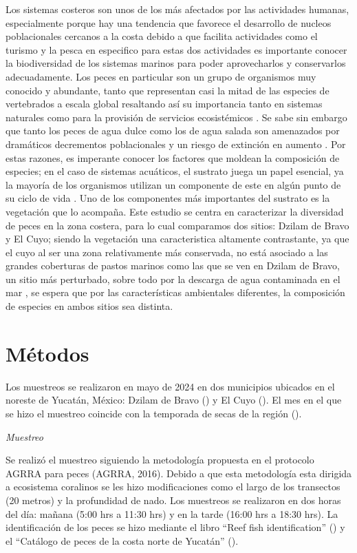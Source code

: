 \documentclass[
  authoryear,
  preprint,
  3p]{elsarticle}
\begin{document}
Los sistemas costeros son unos de los más afectados por las actividades
humanas, especialmente porque hay una tendencia que favorece el
desarrollo de nucleos poblacionales cercanos a la costa debido a que
facilita actividades como el turismo y la pesca \citep{barragán2015} en
especifico para estas dos actividades es importante conocer la
biodiversidad de los sistemas marinos para poder aprovecharlos y
conservarlos adecuadamente. Los peces en particular son un grupo de
organismos muy conocido y abundante, tanto que representan casi la mitad
de las especies de vertebrados a escala global \citep{bingpeng2018}
resaltando así su importancia tanto en sistemas naturales como para la
provisión de servicios ecosistémicos \citep{rönnbäck2007} . Se sabe sin
embargo que tanto los peces de agua dulce como los de agua salada son
amenazados por dramáticos decrementos poblacionales y un riesgo de
extinción en aumento \citep{arthington2016}. Por estas razones, es
imperante conocer los factores que moldean la composición de especies;
en el caso de sistemas acuáticos, el sustrato juega un papel esencial,
ya la mayoría de los organismos utilizan un componente de este en algún
punto de su ciclo de vida \citep{rönnbäck2007}. Uno de los componentes
más importantes del sustrato es la vegetación que lo acompaña. Este
estudio se centra en caracterizar la diversidad de peces en la zona
costera, para lo cual comparamos dos sitios: Dzilam de Bravo y El Cuyo;
siendo la vegetación una caracteristica altamente contrastante, ya que
el cuyo al ser una zona relativamente más conservada, no está asociado a
las grandes coberturas de pastos marinos como las que se ven en Dzilam
de Bravo, un sitio más perturbado, sobre todo por la descarga de agua
contaminada en el mar \citep{kantunmanzano2018}, se espera que por las
características ambientales diferentes, la composición de especies en
ambos sitios sea distinta.

\section{Métodos}\label{muxe9todos}

Los muestreos se realizaron en mayo de 2024 en dos municipios ubicados
en el noreste de Yucatán, México: Dzilam de Bravo () y El Cuyo (). El
mes en el que se hizo el muestreo coincide con la temporada de secas de
la región ().

\emph{Muestreo}

Se realizó el muestreo siguiendo la metodología propuesta en el
protocolo AGRRA para peces (AGRRA, 2016). Debido a que esta metodología
esta dirigida a ecosistema coralinos se les hizo modificaciones como el
largo de los transectos (20 metros) y la profundidad de nado. Los
muestreos se realizaron en dos horas del día: mañana (5:00 hrs a 11:30
hrs) y en la tarde (16:00 hrs a 18:30 hrs). La identificación de los
peces se hizo mediante el libro ``Reef fish identification'' () y el
``Catálogo de peces de la costa norte de Yucatán'' ().
\end{document}
